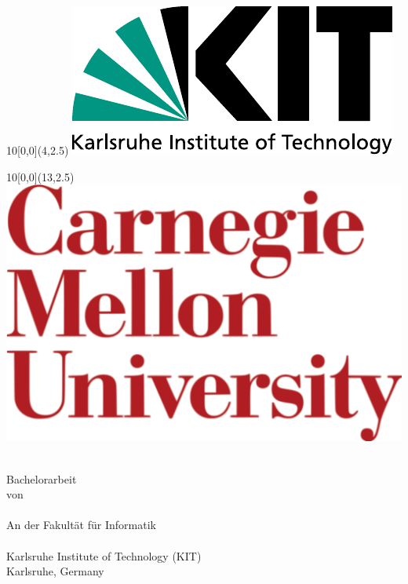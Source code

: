 
\newcommand{\diameter}{20}
\newcommand{\xone}{-15}
\newcommand{\xtwo}{160}
\newcommand{\yone}{15}
\newcommand{\ytwo}{-253}

\begin{titlepage}
    \begin{textblock}{10}[0,0](4,2.5)
        \includegraphics[width=.3\textwidth]{logos/KITLogo_RGB.pdf}
    \end{textblock}
    \begin{textblock}{10}[0,0](13,2.5)
        \includegraphics[width=.3\textwidth]{logos/cmu-logo.pdf}
    \end{textblock}
	\vspace*{3.5cm}
	\begin{center}
		\Huge{\mytitle}
		\vspace*{2cm}\\
		\Large{
												  {Bachelorarbeit\\von}
		}\\
		\vspace*{1cm}
		\huge{\myname}\\
		\vspace*{1cm}
		\Large{
													{An der Fakult\"at f\"ur Informatik}
			\\
			\myinstitute\\
            Karlsruhe Institute of Technology (KIT)\\
            Karlsruhe, Germany\\
}
\end{center}
\end{titlepage}
